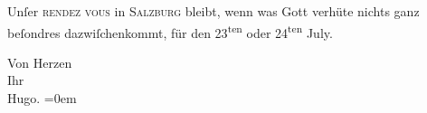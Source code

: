 \pstart
           Unſer \textsc{rendez vous} in \textsc{Salzburg} bleibt, wenn was Gott verhüte nichts ganz beſondres dazwiſchenkommt, für den
                     23\textsuperscript{ten} oder 24\textsuperscript{ten} July.\pend
           
\pstart
           Von Herzen{\\[\baselineskip]}Ihr{\\[\baselineskip]}\spacefill\mbox{Hugo.}\pend
           \leftskip=0em{}\endnumbering{}  \newcommand{\dateiname}{L00697}\newcommand{\titel}{Hugo von Hofmannsthal an Arthur Schnitzler, 9. [7. 1897]}\newcommand{\editorInnen}{Martin Anton Müller und Gerd-Hermann Susen}
